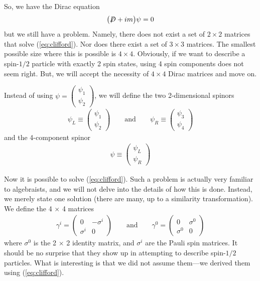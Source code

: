 \documentclass[12pt,epsf]{article}
\begin{document}
So, we have the Dirac equation
\begin{eqnarray}
\big({\displaystyle{\not}D} + im \big) \psi = 0 \label{eq:dirac}
\end{eqnarray}
but we still have a problem.  Namely, there does not exist a set of
$2\times 2$ matrices that solve (\ref{eq:clifford}).  Nor does there
exist a set of $3\times 3$ matrices.  The smallest possible size where
this is possible is $4\times 4$.  Obviously, if we want to describe a
spin-$1/2$ particle with exactly 2 spin states, using 4 spin
components does not seem right.  But, we will accept the necessity of
$4\times 4$  Dirac matrices and move on.  

Instead of using $\psi = 
\begin{pmatrix}
\psi_1 \\ \psi_2
\end{pmatrix}$, we will define the two 2-dimensional spinors
\begin{eqnarray}
\psi_L \equiv 
\begin{pmatrix}
\psi_1 \\ \psi_2
\end{pmatrix} \qquad \mbox{and} \qquad \psi_R \equiv
\begin{pmatrix}
\psi_3 \\ \psi_4
\end{pmatrix} \label{eq:leftright}
\end{eqnarray} 
and the 4-component spinor
\begin{eqnarray}
\psi \equiv \begin{pmatrix} \psi_L \\ \psi_R \end{pmatrix}
\label{eq:diracspinor}
\end{eqnarray}

Now it is possible to solve (\ref{eq:clifford}).  Such a problem is
actually very familiar to algebraists, and we will not delve into the
details of how this is done.  Instead, we merely state one solution
(there are many, up to a similarity transformation).  We define the
4 $\times$ 4 matrices
\begin{eqnarray}
\gamma^i = 
\begin{pmatrix}
0 & -\sigma^i \\ \sigma^i & 0
\end{pmatrix} \qquad \mbox{and} \qquad \gamma^0 = 
\begin{pmatrix}
0 & \sigma^0 \\ \sigma^0 & 0
\end{pmatrix} \label{eq:gammamat}
\end{eqnarray}
where $\sigma^0$ is the 2 $\times$ 2 identity matrix, and $\sigma^i$ are
the Pauli spin matrices.  It should be no surprise that they show up in
attempting to describe spin-$1/2$ particles.  What is interesting is
that we did not assume them---we derived them using
(\ref{eq:clifford}).  
\end{document}
